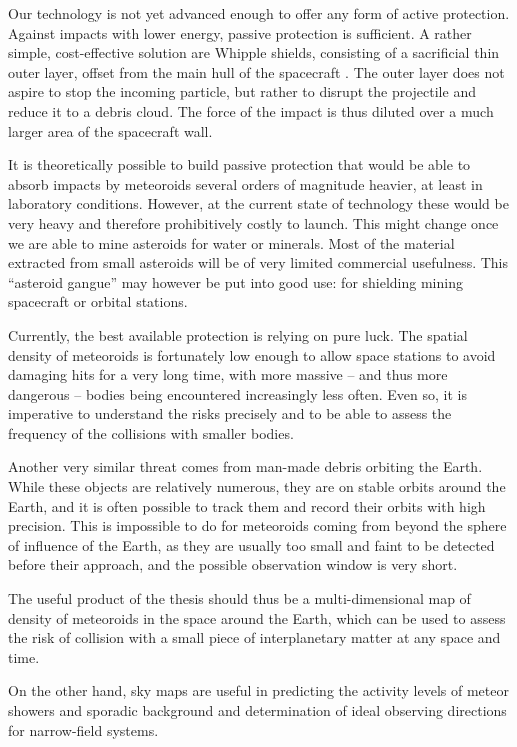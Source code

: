     Our technology is not yet advanced enough to offer any form of active protection.
    Against impacts with lower energy, passive protection is sufficient.
    A rather simple, cost-effective solution are Whipple shields, consisting of a sacrificial thin outer layer,
    offset from the main hull of the spacecraft \citep{nasa-shield}.
    The outer layer does not aspire to stop the incoming particle,
    but rather to disrupt the projectile and reduce it to a debris cloud.
    The force of the impact is thus diluted over a much larger area of the spacecraft wall.

    It is theoretically possible to build passive protection that would be able to absorb impacts
    by meteoroids several orders of magnitude heavier, at least in laboratory conditions.
    However, at the current state of technology these would be very heavy and therefore prohibitively costly to launch.
    This might change once we are able to mine asteroids for water or minerals.
    Most of the material extracted from small asteroids will be of very limited commercial usefulness.
    This ``asteroid gangue'' may however be put into good use: for shielding mining spacecraft or orbital stations.

    Currently, the best available protection is relying on pure luck. The spatial density of meteoroids is
    fortunately low enough to allow space stations to avoid damaging hits for a very long time,
    with more massive -- and thus more dangerous -- bodies being encountered increasingly less often.
    Even so, it is imperative to understand the risks precisely and to be able to assess the frequency
    of the collisions with smaller bodies.

    Another very similar threat comes from man-made debris orbiting the Earth.
    While these objects are relatively numerous, they are on stable orbits around
    the Earth, and it is often possible to track them and record their orbits with high precision.
    This is impossible to do for meteoroids coming from beyond the sphere of influence of the Earth,
    as they are usually too small and faint to be detected before their approach, and the possible
    observation window is very short.

    The useful product of the thesis should thus be a multi-dimensional map of density
    of meteoroids in the space around the Earth, which can be used to assess the risk
    of collision with a small piece of interplanetary matter at any space and time.

    On the other hand, sky maps are useful in predicting the activity levels of
    meteor showers and sporadic background and determination of ideal observing
    directions for narrow-field systems.

